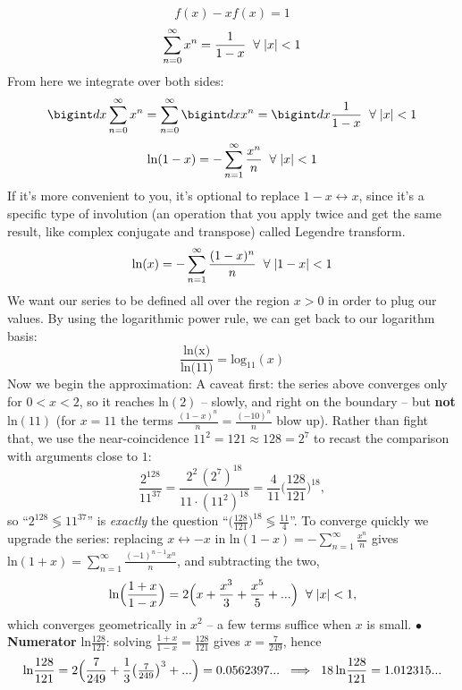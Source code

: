 \documentclass[11pt]{article}
\newcommand{\mm}[1]{\hspace{#1mm}}
\begin{document}
{$$f(x) - xf(x) = 1$$
$$\sum_{n = 0}^\infty x^n = \frac{1}{1 - x}\mm{2}\forall \mm{1}|x| < 1$$
From here we integrate over both sides:
$$\bigint dx \sum_{n = 0}^\infty x^n = \sum_{n = 0}^\infty \bigint dx x^n = \bigint dx \frac{1}{1 - x} \mm{2}\forall \mm{1}|x| < 1$$
$$\text{ln}(1 - x) = -\sum_{n = 1}^\infty \frac{x^n}{n} \mm{2}\forall \mm{1}|x| < 1$$
If it's more convenient to you, it's optional to replace $1 - x \leftrightarrow x$, since it's a specific type of involution (an operation that you apply twice and get the same result, like complex conjugate and transpose) called Legendre transform.
$$\text{ln}(x) = -\sum_{n = 1}^\infty \frac{(1 - x)^n}{n} \mm{2}\forall \mm{1}|1 - x| < 1$$
We want our series to be defined all over the region $x > 0$ in order to plug our values.\newline
By using the logarithmic power rule, we can get back to our logarithm basis: 
$$\frac{\text{ln(x)}}{\text{ln(11)}} = \text{log}_{11}(x)$$
Now we begin the approximation:
\newline
A caveat first: the series above converges only for $0 < x < 2$, so it reaches $\text{ln}(2)$ -- slowly, and right on the boundary -- but \textbf{not} $\text{ln}(11)$ (for $x = 11$ the terms $\frac{(1 - x)^n}{n} = \frac{(-10)^n}{n}$ blow up). Rather than fight that, we use the near-coincidence $11^2 = 121 \approx 128 = 2^7$ to recast the comparison with arguments close to $1$:
$$\frac{2^{128}}{11^{37}} = \frac{2^2\,(2^7)^{18}}{11\cdot (11^2)^{18}} = \frac{4}{11}\Big(\frac{128}{121}\Big)^{18},$$
so ``$2^{128} \lessgtr 11^{37}$'' is \textit{exactly} the question ``$\big(\frac{128}{121}\big)^{18} \lessgtr \frac{11}{4}$''.
\newline
To converge quickly we upgrade the series: replacing $x \leftrightarrow -x$ in $\text{ln}(1 - x) = -\sum_{n = 1}^\infty \frac{x^n}{n}$ gives $\text{ln}(1 + x) = \sum_{n = 1}^\infty \frac{(-1)^{n - 1} x^n}{n}$, and subtracting the two,
$$\text{ln}\Big(\frac{1 + x}{1 - x}\Big) = 2\Big(x + \frac{x^3}{3} + \frac{x^5}{5} + ...\Big) \mm{2}\forall\mm{1}|x| < 1,$$
which converges geometrically in $x^2$ -- a few terms suffice when $x$ is small.
\newline
$\bullet$\mm{1}\textbf{Numerator} $\text{ln}\frac{128}{121}$: solving $\frac{1 + x}{1 - x} = \frac{128}{121}$ gives $x = \frac{7}{249}$, hence
$$\text{ln}\frac{128}{121} = 2\Big(\frac{7}{249} + \frac{1}{3}\big(\tfrac{7}{249}\big)^3 + ...\Big) = 0.0562397...\mm{2}\Longrightarrow\mm{2} 18\,\text{ln}\frac{128}{121} = 1.012315...$$
}
\end{document}
